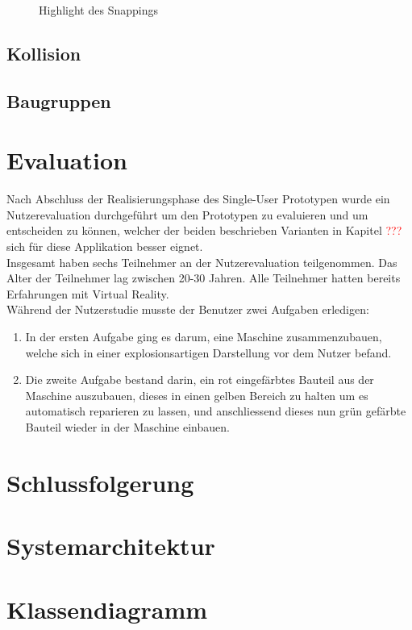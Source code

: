 \begin{figure}[h!]
\begin{minipage}[b]{0.49\linewidth}
		\caption{Highlight des Snappings}
		\label{fig:snapping}
	\end{minipage}
\end{figure}

\subsection{Kollision}

\subsection{Baugruppen}

\section{Evaluation}
Nach Abschluss der Realisierungsphase des Single-User Prototypen wurde ein Nutzerevaluation durchgeführt um den Prototypen zu evaluieren und um entscheiden zu können, welcher der beiden beschrieben Varianten in Kapitel \textcolor{red}{???} sich für diese Applikation besser eignet. \\

\noindent Insgesamt haben sechs Teilnehmer an der Nutzerevaluation teilgenommen. Das Alter der Teilnehmer lag zwischen 20-30 Jahren. Alle Teilnehmer hatten bereits Erfahrungen mit Virtual Reality. \\

\noindent Während der Nutzerstudie musste der Benutzer zwei Aufgaben erledigen:
\begin{enumerate}
	\item In der ersten Aufgabe ging es darum, eine Maschine zusammenzubauen, welche sich in einer explosionsartigen Darstellung vor dem Nutzer befand.
	
	
	\item Die zweite Aufgabe bestand darin, ein rot eingefärbtes Bauteil aus der Maschine auszubauen, dieses in einen gelben Bereich zu halten um es automatisch reparieren zu lassen, und anschliessend dieses nun grün gefärbte Bauteil wieder in der Maschine einbauen.
	
\end{enumerate}
\section{Schlussfolgerung}

\section{Systemarchitektur}

\section{Klassendiagramm}